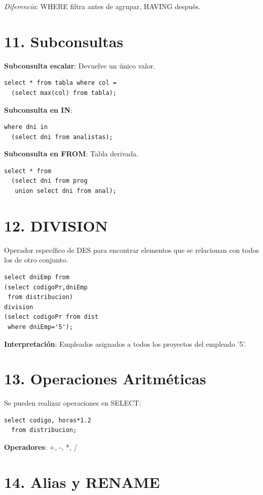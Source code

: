 \documentclass[10pt,a4paper,twocolumn]{article}
\begin{document}
\textit{Diferencia}: WHERE filtra antes de agrupar, HAVING después.

\section*{11. Subconsultas}

\textbf{Subconsulta escalar}: Devuelve un único valor.
\begin{lstlisting}
select * from tabla where col =
  (select max(col) from tabla);
\end{lstlisting}

\textbf{Subconsulta en IN}:
\begin{lstlisting}
where dni in 
  (select dni from analistas);
\end{lstlisting}

\textbf{Subconsulta en FROM}: Tabla derivada.
\begin{lstlisting}
select * from 
  (select dni from prog 
   union select dni from anal);
\end{lstlisting}

\section*{12. DIVISION}

Operador específico de DES para encontrar elementos que se relacionan con todos los de otro conjunto.

\begin{lstlisting}
select dniEmp from
(select codigoPr,dniEmp 
 from distribucion)
division
(select codigoPr from dist
 where dniEmp='5');
\end{lstlisting}

\textbf{Interpretación}: Empleados asignados a todos los proyectos del empleado '5'.

\section*{13. Operaciones Aritméticas}

Se pueden realizar operaciones en SELECT:
\begin{lstlisting}
select codigo, horas*1.2 
  from distribucion;
\end{lstlisting}

\textbf{Operadores}: +, -, *, /

\section*{14. Alias y RENAME}
\end{document}
